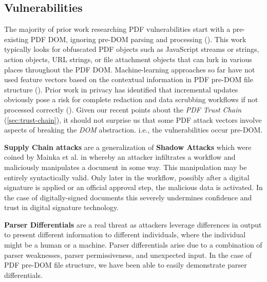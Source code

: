 \subsection{Vulnerabilities}
\label{sec:vulnerabilities}


The majority of prior work researching PDF vulnerabilities start with a pre-existing PDF DOM,
ignoring pre-DOM parsing and processing
(\cite{smutzMaliciousPDFDetection2012,liuDetectingMaliciousJavascript2014,iwamotoStudyMaliciousPDF2016}). 
This work typically looks for obfuscated PDF objects such as
JavaScript streams or strings, action objects, URL strings, or file attachment objects that 
can lurk in various places throughout the PDF DOM. Machine-learning approaches so far have not  
used feature vectors based on the contextual information in PDF pre-DOM file structure 
(\cite{andrewmangleAnalysisMachineLearning2021,manharmohammedHAPSSAHolisticApproach2021}). 
Prior work in privacy has identified that incremental updates obviously pose a risk for complete
redaction and data scrubbing workflows if not processed correctly (\cite{adhataraoHowArePDF2021,y.fengSystematicMethodPDF2018}).
Given our recent points about the \emph{PDF Trust Chain} (\cref{sec:trust-chain}), it should not 
surprise us that some PDF attack vectors involve aspects of breaking the \emph{DOM} abstraction.
i.e., the vulnerabilities occur pre-DOM.

{\bf{Supply Chain attacks}} are a generalization of {\bf{Shadow Attacks}} which were coined by Mainka 
et al. in \cite{mainkaShadowAttacksHiding2021} whereby an attacker infiltrates a workflow and 
maliciously manipulates a document in some way. This manipulation may be entirely syntactically valid.
Only later in the workflow, possibly after a 
digital signature is applied or an official approval step, the malicious data is 
activated. In the case of digitally-signed documents this severely undermines confidence and trust
in digital signature technology.

{\bf{Parser Differentials}} are a real threat as attackers leverage differences in output
to present different information to different individuals, where the individual might be a human
or a machine. Parser differentials arise due to a combination of parser weaknesses, 
parser permissiveness, and unexpected input. In the case of PDF pre-DOM file structure, we have been
able to easily demonstrate parser differentials.

